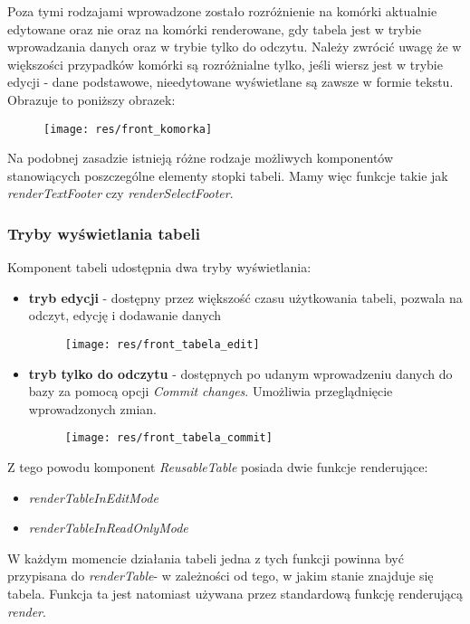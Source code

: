 \documentclass[11pt]{article}
\begin{document}
Poza tymi rodzajami wprowadzone zostało rozróżnienie na komórki aktualnie edytowane oraz nie oraz na komórki renderowane, gdy tabela jest w trybie wprowadzania danych oraz w trybie tylko do odczytu. \newline
Należy zwrócić uwagę że w większości przypadków komórki są rozróżnialne tylko, jeśli wiersz jest w trybie edycji - dane podstawowe, nieedytowane wyświetlane są zawsze w formie tekstu. Obrazuje to poniższy obrazek:
\begin{figure}[H]
\centering
\texttt{[image: res/front\_komorka]}
\end{figure}
Na podobnej zasadzie istnieją różne rodzaje możliwych komponentów stanowiących poszczególne elementy stopki tabeli. Mamy więc funkcje takie jak \emph{renderTextFooter} czy \emph{renderSelectFooter}.

\subsubsection{Tryby wyświetlania tabeli}
Komponent tabeli udostępnia dwa tryby wyświetlania:
\begin{itemize}
\item \textbf{tryb edycji} - dostępny przez większość czasu użytkowania tabeli, pozwala na odczyt, edycję i dodawanie danych
\begin{figure}[H]
\centering
\texttt{[image: res/front\_tabela\_edit]}
\end{figure}
\item \textbf{tryb tylko do odczytu} - dostępnych po udanym wprowadzeniu danych do bazy za pomocą opcji \emph{Commit changes}. Umożliwia przeglądnięcie wprowadzonych zmian.
\begin{figure}[H]
\centering
\texttt{[image: res/front\_tabela\_commit]}
\end{figure}
\end{itemize}
Z tego powodu komponent \emph{ReusableTable} posiada dwie funkcje renderujące:
\begin{itemize}
\item \emph{renderTableInEditMode}
\item \emph{renderTableInReadOnlyMode}
\end{itemize}
W każdym momencie działania tabeli jedna z tych funkcji powinna być przypisana do \emph{renderTable}- w zależności od tego, w jakim stanie znajduje się tabela. Funkcja ta jest natomiast używana przez standardową funkcję renderującą \emph{render}.
\end{document}
